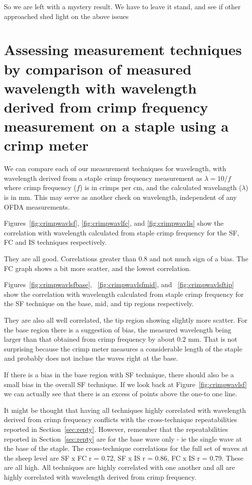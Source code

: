 \documentclass[titlepage,10pt]{article}  %
\begin{document}
So we are left with a mystery result. We have to leave it stand, and see if other approached shed light on the above issues


\clearpage
\section{Assessing measurement techniques by comparison of measured wavelength with wavelength derived from crimp frequency measurement on a staple using a crimp meter}
We can compare each of our measurement techniques for wavelength, with wavelength derived from a staple crimp frequency measurement as $\lambda = 10/f$ where crimp frequency ($f$) is in crimps per cm, and the calculated wavelangth ($\lambda$) is in mm. This may serve as another check on wavelength, independent of any OFDA measurements.

Figures~\ref{fig:crimpwavlsf}, \ref{fig:crimpwavlfc}, and \ref{fig:crimpwavlis} show the correlation with wavelength calculated from staple crimp frequency for the SF, FC and IS techniques respectively.



They are all good. Correlations greater than 0.8 and not much sign of a bias. The FC graph shows a bit more scatter, and the lowest correlation.

Figures~\ref{fig:crimpwavlsfbase}, ~\ref{fig:crimpwavlsfmid}, and ~\ref{fig:crimpwavlsftip} show the correlation with wavelength calculated from staple crimp frequency for the SF technique on the base, mid, and tip regions respectively. 



They are also all well correlated, the tip region showing slightly more scatter. For the base region there is a suggestion of bias, the measured wavelength being larger than that obtained from crimp frequency by about 0.2 mm. That is not surprising because the crimp meter measures a considerable length of the staple and probably does not incluse the waves right at the base. 

If there is a bias in the base region with SF technique, there should also be a small bias in the overall SF technique. If we look back at  Figure~\ref{fig:crimpwavlsf} we can actually see that there is an excess of points above the one-to one line. 

It might be thought that having all techniques highly correlated with wavelength derived from crimp frequency conflicts with the cross-technique repeatabilities reported in Section~\ref{sec:repty}. However, remember that the repeatabilities reported in Section~\ref{sec:repty} are for the base wave only - ie the single wave at the base of the staple. The cross-technique correlations for the full set of waves at the sheep level are SF x FC r = 0.72, SF x IS r = 0.86, FC x IS r = 0.79.  These are all high.  All techniques are highly correlated with one another and all are highly correlated with wavelength derived from crimp frequency.
\end{document}
